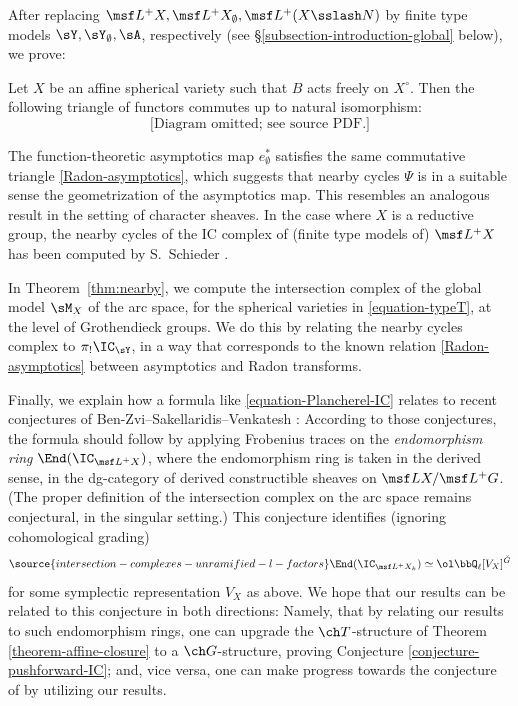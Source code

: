 After replacing $\msf L^+X, \msf L^+ X_\emptyset, \msf L^+(X\sslash N)$ by finite type models $\sY, \sY_\emptyset, \sA$, respectively (see \S\ref{subsection-introduction-global} below), we prove:

\begin{thm}
\notready
\label{thm:nearby-asymptotics}
Let $X$ be an affine spherical variety such that $B$ acts freely on $X^\circ$.
Then the following triangle of functors commutes up to natural isomorphism:
\[ \text{[Diagram omitted; see source PDF.]}
\]
\end{thm}

The function-theoretic asymptotics map $e_\emptyset^*$ satisfies the same
commutative triangle \eqref{Radon-asymptotics}, which suggests that nearby cycles $\Psi$
is in a suitable sense the geometrization of the asymptotics map.
This resembles an analogous result \cite[Corollary 6.2]{BFO} in the setting
of character sheaves.
In the case where $X$ is a reductive group, the nearby cycles of the IC complex
of (finite type models of) $\msf L^+X$
has been computed by S.~Schieder \cite{Sch-SL2,Sch-G,Sch}.

In Theorem~\ref{thm:nearby}, we compute the intersection complex of the global model $\sM_X$ of the arc space, for the spherical varieties in \eqref{equation-typeT}, at the level of Grothendieck groups. We do this by relating the nearby cycles complex to $\pi_!\IC_\sY$, in a way that corresponds to the known relation \eqref{Radon-asymptotics} between asymptotics and Radon transforms.


Finally, we explain how a formula like \eqref{equation-Plancherel-IC} relates to recent conjectures of Ben-Zvi--Sakellaridis--Venkatesh \cite{BZSV}: According to those conjectures, the formula should follow by applying Frobenius traces on the \emph{endomorphism ring} $\End(\IC_{\msf L^+X})$, where the endomorphism ring is taken in the derived sense, in the dg-category of derived constructible sheaves on $\msf LX/\msf L^+G$. (The proper definition of the intersection complex on the arc space remains conjectural, in the singular setting.) This conjecture identifies (ignoring cohomological grading)
\begin{equation}\label{equation-BZSV}
\source{intersection-complexes-unramified-l-factors}
  \End( \IC_{\msf L^+X_k} ) \simeq \ol\bbQ_\ell [V_X]^{\check G}
\end{equation}
for some symplectic representation $V_X$ as above. We hope that our results can be related to this conjecture in both directions: Namely, that by relating our results to such endomorphism rings, one can upgrade the $\ch T$-structure of Theorem \ref{theorem-affine-closure} to a $\ch G$-structure, proving Conjecture \ref{conjecture-pushforward-IC}; and, vice versa, one can make progress towards the conjecture of \cite{BZSV} by utilizing our results.


